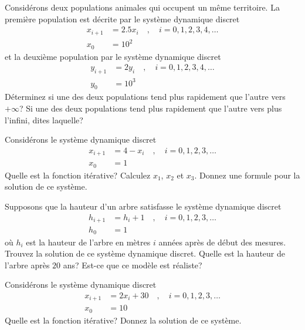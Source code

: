 \begin{question}[\life]
Considérons deux populations animales qui occupent un même territoire.
La première population est décrite par le système dynamique discret
\begin{equation} \label{sect26eq1}
\begin{split}
x_{i+1} & = 2.5 x_i \quad , \quad i=0, 1, 2, 3, 4, \ldots \\
x_0 &= 10^2
\end{split}
\end{equation}
et la deuxième population par le système dynamique discret
\begin{equation}
\begin{split}  \label{sect26eq2}
y_{i+1} & = 2 y_i \quad , \quad i=0, 1, 2, 3, 4, \ldots \\
y_0 &= 10^3
\end{split}
\end{equation}
Déterminez si une des deux populations tend plus rapidement que l'autre
vers $+\infty$?  Si une des deux populations tend plus rapidement que
l'autre vers plus l'infini, dites laquelle?
\label{6Q74}
\end{question}

\begin{question}[\life]
Considérons le système dynamique discret
\begin{align*}
x_{i+1} &= 4-x_i \quad , \quad i=0, 1, 2, 3, \ldots \\
x_0 &= 1
\end{align*}
Quelle est la fonction itérative?  Calculez $x_1$, $x_2$ et $x_3$.
Donnez une formule pour la solution de ce système.
\label{6Q75}
\end{question}

\begin{question}[\life]
Supposons que la hauteur d'un arbre satisfasse le système dynamique discret
\begin{align*}
h_{i+1} &= h_i + 1 \quad , \quad i=0, 1, 2, 3, \ldots \\
h_0 &= 1
\end{align*}
où $h_i$ est la hauteur de l'arbre en mètres $i$ années après de début des
mesures.  Trouvez la solution de ce système dynamique discret.  Quelle est la
hauteur de l'arbre après $20$ ans?  Est-ce que ce modèle est réaliste?
\label{6Q76}
\end{question}

\begin{question}[\life]
Considérons le système dynamique discret
\begin{align*}
x_{i+1} &= 2x_i + 30 \quad , \quad i=0, 1, 2, 3, \ldots \\
x_0 &= 10
\end{align*}
Quelle est la fonction itérative?  Donnez la solution de ce système.
\label{6Q77}
\end{question}

